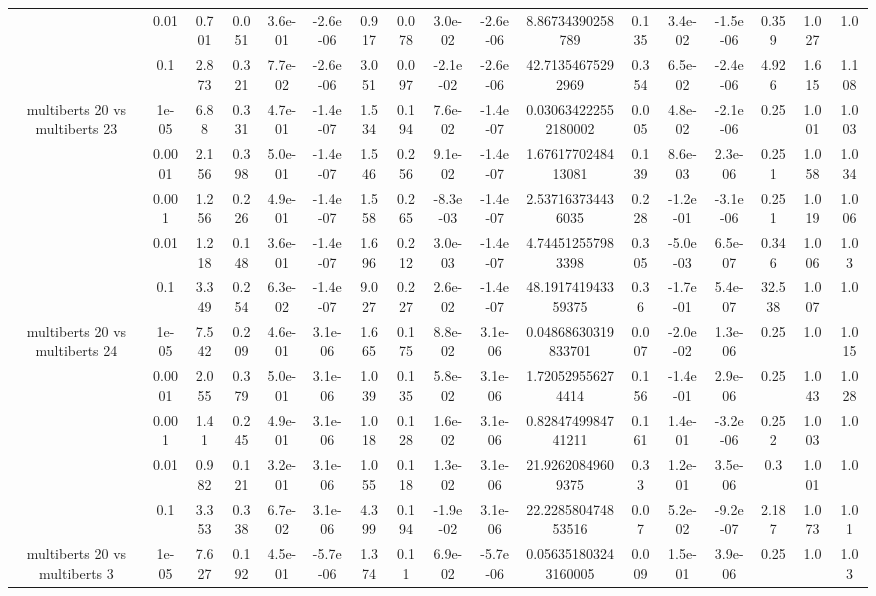 \begin{tabular}{|c|c|c|c|c|c|c|c|c|c|c|c|c|c|c|c|c|}
 & 0.01 & 0.701 & 0.051 & 3.6e-01 & -2.6e-06 & 0.917 & 0.078 & 3.0e-02 & -2.6e-06 & 8.86734390258789 & 0.135 & 3.4e-02 & -1.5e-06 & 0.359 & 1.027 & 1.0 \\
 & 0.1 & 2.873 & 0.321 & 7.7e-02 & -2.6e-06 & 3.051 & 0.097 & -2.1e-02 & -2.6e-06 & 42.71354675292969 & 0.354 & 6.5e-02 & -2.4e-06 & 4.926 & 1.615 & 1.108 \\
\hline
\multirow{5}{*}{multiberts 20 vs multiberts 23} & 1e-05 & 6.88 & 0.331 & 4.7e-01 & -1.4e-07 & 1.534 & 0.194 & 7.6e-02 & -1.4e-07 & 0.030634222552180002 & 0.005 & 4.8e-02 & -2.1e-06 & 0.25 & 1.001 & 1.003 \\
 & 0.0001 & 2.156 & 0.398 & 5.0e-01 & -1.4e-07 & 1.546 & 0.256 & 9.1e-02 & -1.4e-07 & 1.6761770248413081 & 0.139 & 8.6e-03 & 2.3e-06 & 0.251 & 1.058 & 1.034 \\
 & 0.001 & 1.256 & 0.226 & 4.9e-01 & -1.4e-07 & 1.558 & 0.265 & -8.3e-03 & -1.4e-07 & 2.537163734436035 & 0.228 & -1.2e-01 & -3.1e-06 & 0.251 & 1.019 & 1.006 \\
 & 0.01 & 1.218 & 0.148 & 3.6e-01 & -1.4e-07 & 1.696 & 0.212 & 3.0e-03 & -1.4e-07 & 4.744512557983398 & 0.305 & -5.0e-03 & 6.5e-07 & 0.346 & 1.006 & 1.03 \\
 & 0.1 & 3.349 & 0.254 & 6.3e-02 & -1.4e-07 & 9.027 & 0.227 & 2.6e-02 & -1.4e-07 & 48.191741943359375 & 0.36 & -1.7e-01 & 5.4e-07 & 32.538 & 1.007 & 1.0 \\
\hline
\multirow{5}{*}{multiberts 20 vs multiberts 24} & 1e-05 & 7.542 & 0.209 & 4.6e-01 & 3.1e-06 & 1.665 & 0.175 & 8.8e-02 & 3.1e-06 & 0.04868630319833701 & 0.007 & -2.0e-02 & 1.3e-06 & 0.25 & 1.0 & 1.015 \\
 & 0.0001 & 2.055 & 0.379 & 5.0e-01 & 3.1e-06 & 1.039 & 0.135 & 5.8e-02 & 3.1e-06 & 1.720529556274414 & 0.156 & -1.4e-01 & 2.9e-06 & 0.25 & 1.043 & 1.028 \\
 & 0.001 & 1.41 & 0.245 & 4.9e-01 & 3.1e-06 & 1.018 & 0.128 & 1.6e-02 & 3.1e-06 & 0.8284749984741211 & 0.161 & 1.4e-01 & -3.2e-06 & 0.252 & 1.003 & 1.0 \\
 & 0.01 & 0.982 & 0.121 & 3.2e-01 & 3.1e-06 & 1.055 & 0.118 & 1.3e-02 & 3.1e-06 & 21.92620849609375 & 0.33 & 1.2e-01 & 3.5e-06 & 0.3 & 1.001 & 1.0 \\
 & 0.1 & 3.353 & 0.338 & 6.7e-02 & 3.1e-06 & 4.399 & 0.194 & -1.9e-02 & 3.1e-06 & 22.228580474853516 & 0.07 & 5.2e-02 & -9.2e-07 & 2.187 & 1.073 & 1.01 \\
\hline
\multirow{5}{*}{multiberts 20 vs multiberts 3} & 1e-05 & 7.627 & 0.192 & 4.5e-01 & -5.7e-06 & 1.374 & 0.11 & 6.9e-02 & -5.7e-06 & 0.056351803243160005 & 0.009 & 1.5e-01 & 3.9e-06 & 0.25 & 1.0 & 1.03 \\

\end{tabular}
